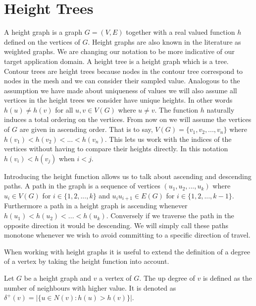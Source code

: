 
\section{Height Trees}


A height graph is a graph $G = (V, E)$ together with a real valued function $h$ defined on the vertices of $G$. Height graphs are also known in the literature as weighted graphs. We are changing our notation to be more indicative of our target application domain. A height tree is a height graph which is a tree. Contour trees are height trees because nodes in the contour tree correspond to nodes in the mesh and we can consider their sampled value. Analogous to the assumption we have made about uniqueness of values we will also assume all vertices in the height trees we consider have unique heights. In other words $h(u) \ne h(v)$ for all $u ,v \in V(G)$ where $u \ne v$. The function $h$ naturally induces a total ordering on the vertices. From now on we will assume the vertices of $G$ are given in ascending order. That is to say, $V(G) = \{v_1, v_2, ... , v_n\}$ where $h(v_1) < h(v_2) < ... < h(v_n)$. This lets us work with the indices of the vertices without having to compare their heights directly. In this notation $h(v_i) < h(v_j)$ when $i < j$.


Introducing the height function allows us to talk about ascending and descending paths. A path in the graph is a sequence of vertices $(u_1, u_2, ... , u_k)$ where $u_i \in V(G)$ for $i \in \{1, 2, ..., k\}$ and $u_iu_{i+1} \in E(G)$ for $i \in \{1, 2, ..., k-1\}$. Furthermore a path in a height graph is ascending whenever $h(u_1) < h(u_2) < ... < h(u_k)$. Conversely if we traverse the path in the opposite direction it would be descending. We will simply call these paths monotone whenever we wish to avoid committing to a specific direction of travel.

When working with height graphs it is useful to extend the definition of a degree of a vertex by taking the height function into account.

\begin{defn} Let $G$ be a height graph and $v$ a vertex of $G$. The up degree of $v$ is defined as the number of neighbours with higher value. It is denoted as $\delta^+(v) = \big|\{ u \in N(v) : h(u) > h(v) \}\big|$.   \end{defn}

